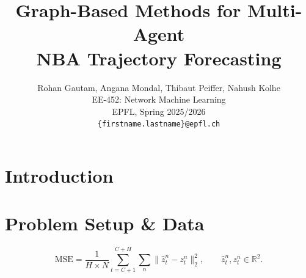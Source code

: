 \documentclass{article} %
\title{Graph-Based Methods for Multi-Agent\\ NBA Trajectory Forecasting}
\author{Rohan Gautam, Angana Mondal, Thibaut Peiffer, Nahush Kolhe \\
EE-452: Network Machine Learning\\
EPFL, Spring 2025/2026 \\
\texttt{\{firstname.lastname\}@epfl.ch}
}
\begin{document}
\maketitle

\begin{abstract}
\end{abstract}

\section{Introduction}
\label{sec:intro}

\section{Problem Setup \& Data}
\label{sec:setup}
\begin{equation}
\label{eq:mse}
\mathrm{MSE} = \frac{1}{H\times N}\sum_{t=C+1}^{C+H}\sum_{n}
\big\lVert \hat{z}^n_t - z^n_t \big\rVert_2^2,
\qquad \hat{z}^n_t, z^n_t \in \mathbb{R}^2 .
\end{equation}
\end{document}
